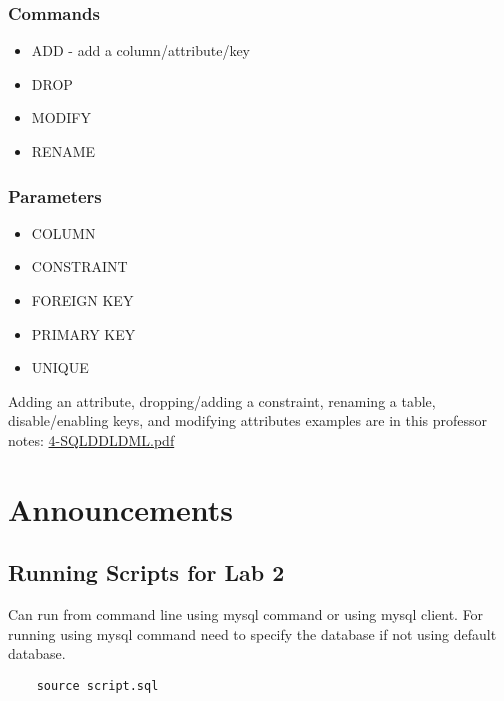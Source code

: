 \documentclass[twoside]{article}
\begin{document}
\subsubsection*{Commands}
\begin{itemize}
    \item ADD - add a column/attribute/key
    \item DROP
    \item MODIFY
    \item RENAME
\end{itemize}
\subsubsection*{Parameters}
\begin{itemize}
    \item COLUMN
    \item CONSTRAINT
    \item FOREIGN KEY
    \item PRIMARY KEY
    \item UNIQUE
\end{itemize}

Adding an attribute, dropping/adding a constraint, renaming a table, disable/enabling
keys, and modifying attributes examples are in this professor notes: \url{4-SQLDDLDML.pdf}

\newpage
\hfill \break 
{}

\section*{Announcements}
\subsection*{Running Scripts for Lab 2}
Can run from command line using mysql command or using mysql client. For 
running using
mysql command need to specify the database if not using default database.
\begin{verbatim}
    source script.sql
\end{verbatim}
\end{document}
